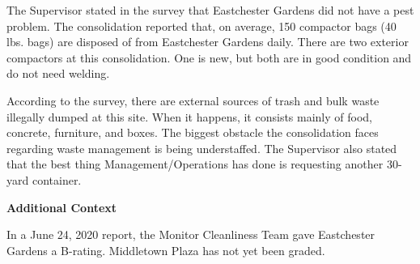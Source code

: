  

The Supervisor stated in the survey that Eastchester Gardens did not have a pest problem. The consolidation reported that, on average, 150 compactor bags (40 lbs. bags) are disposed of from Eastchester Gardens daily. There are two exterior compactors at this consolidation. One is new, but both are in good condition and do not need welding. 

According to the survey, there are external sources of trash and bulk waste illegally dumped at this site.  When it happens, it consists mainly of food, concrete, furniture, and boxes. The biggest obstacle the consolidation faces regarding waste management is being understaffed. The Supervisor also stated that the best thing Management/Operations has done is requesting another 30-yard container.

\textbf{Additional Context}  

In a June 24, 2020 report, the Monitor Cleanliness Team gave Eastchester Gardens a B-rating. Middletown Plaza has not yet been graded. 
